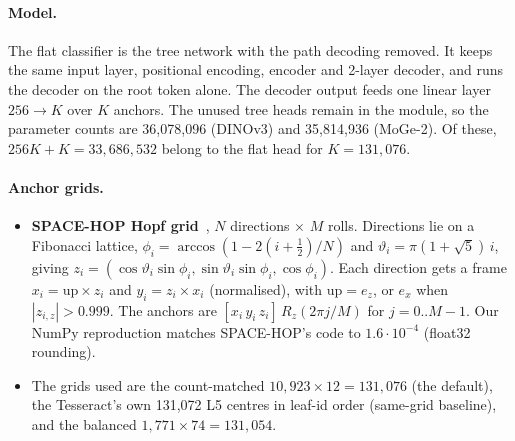 \paragraph{Model.}
The flat classifier is the tree network with the path decoding removed. It keeps the same input layer, positional encoding, encoder and 2-layer decoder, and runs the decoder on the root token alone. The decoder output feeds one linear layer $256\to K$ over $K$ anchors. The unused tree heads remain in the module, so the parameter counts are 36,078,096 (DINOv3) and 35,814,936 (MoGe-2). Of these, $256K+K=33{,}686{,}532$ belong to the flat head for $K=131{,}076$.

\paragraph{Anchor grids.}
\begin{itemize}
  \item \textbf{SPACE-HOP Hopf grid}~\cite{dutta2026spacehop}, $N$ directions $\times$ $M$ rolls. Directions lie on a Fibonacci lattice, $\phi_i=\arccos(1-2(i+\tfrac12)/N)$ and $\vartheta_i=\pi(1+\sqrt5)\,i$, giving $z_i=(\cos\vartheta_i\sin\phi_i,\sin\vartheta_i\sin\phi_i,\cos\phi_i)$. Each direction gets a frame $x_i=\mathrm{up}\times z_i$ and $y_i=z_i\times x_i$ (normalised), with $\mathrm{up}=e_z$, or $e_x$ when $|z_{i,z}|>0.999$. The anchors are $[x_i\,y_i\,z_i]\,R_z(2\pi j/M)$ for $j=0..M-1$. Our NumPy reproduction matches SPACE-HOP's code to $1.6\cdot10^{-4}$ (float32 rounding).
  \item The grids used are the count-matched $10{,}923\times12=131{,}076$ (the default), the Tesseract's own 131,072 L5 centres in leaf-id order (same-grid baseline), and the balanced $1{,}771\times74=131{,}054$.
\end{itemize}

